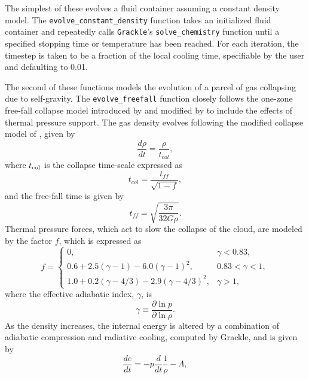 The simplest of these evolves a fluid container assuming a constant
density model.  The \texttt{evolve\_constant\_density} function takes
an initialized fluid container and repeatedly calls \texttt{Grackle}'s
\texttt{solve\_chemistry} function until a specified stopping time or
temperature has been reached.  For each iteration, the timestep is
taken to be a fraction of the local cooling time, specifiable by the
user and defaulting to 0.01.

The second of these functions models the evolution of a parcel of gas
collapsing due to self-gravity.  The \texttt{evolve\_freefall} function
closely follows the one-zone free-fall collapse model introduced by
\citet{2000ApJ...534..809O} and modified by
\citet{2005ApJ...626..627O} to include the effects of thermal pressure
support.  The gas density evolves following the modified collapse
model of \citet{2005ApJ...626..627O}, given by
\begin{equation}
\frac{d \rho}{dt} = \frac{\rho}{t_{col}},
\end{equation}
where $t_{\rm col}$ is the collapse time-scale expressed as
\begin{equation}
t_{col} = \frac{t_{ff}}{\sqrt{1-f}},
\end{equation}
and the free-fall time is given by
\begin{equation}
t_{ff} = \sqrt{\frac{3 \pi}{32 G \rho}}.
\end{equation}
Thermal pressure forces, which act to slow the collapse of the cloud,
are modeled by the factor $f$, which is expressed as
\begin{equation}
f = \left\{
\begin{array}{lr}
0, & \gamma < 0.83,\\
0.6 + 2.5(\gamma - 1) - 6.0(\gamma - 1)^2, & 0.83 < \gamma < 1,\\
1.0 + 0.2(\gamma - 4/3) - 2.9(\gamma - 4/3)^2, & \gamma > 1,
\end{array}
 \right.
\end{equation}
where the effective adiabatic index, $\gamma$, is
\begin{equation}
\gamma \equiv \frac{\partial \ln p}{\partial \ln \rho}.
\end{equation}
As the density increases, the internal energy is altered by a
combination of adiabatic compression and radiative cooling, computed
by Grackle, and is given by
\begin{equation}
\frac{de}{dt}= -p \frac{d}{dt} \frac{1}{\rho} - {\Lambda},
\label{eq:energy}
\end{equation}

